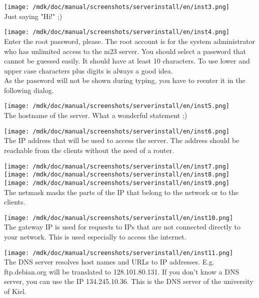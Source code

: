 \texttt{[image: /mdk/doc/manual/screenshots/serverinstall/en/inst3.png]}\\
Just saying "Hi!" ;)



\texttt{[image: /mdk/doc/manual/screenshots/serverinstall/en/inst4.png]}\\
Enter the root password, please. The root account is for the system administrator who has unlimited access to the m23 server. You should select a password that cannot be guessed easily. It should have at least 10 characters. To use lower and upper case characters plus digits is always a good idea.\\
As the password will not be shown during typing, you have to reenter it in the following dialog.



\texttt{[image: /mdk/doc/manual/screenshots/serverinstall/en/inst5.png]}\\
The hostname of the server. What a wonderful statement ;)



\texttt{[image: /mdk/doc/manual/screenshots/serverinstall/en/inst6.png]}
\\
The IP address that will be used to access the server. The address should be reachable from the clients without the need of a router.



\texttt{[image: /mdk/doc/manual/screenshots/serverinstall/en/inst7.png]}\\



\texttt{[image: /mdk/doc/manual/screenshots/serverinstall/en/inst8.png]}
\\



\texttt{[image: /mdk/doc/manual/screenshots/serverinstall/en/inst9.png]}
\\
The netmask masks the parts of the IP that belong to the network or to the clients.



\texttt{[image: /mdk/doc/manual/screenshots/serverinstall/en/inst10.png]}
\\
The gateway IP is used for requests to IPs that are not connected directly to your network. This is used especially to access the internet.



\texttt{[image: /mdk/doc/manual/screenshots/serverinstall/en/inst11.png]}
\\
The DNS server resolves host names and URLs to IP addresses. E.g. ftp.debian.org will be translated to 128.101.80.131. If you don't know a DNS server, you can use the IP 134.245.10.36. This is the DNS server of the university of Kiel.



